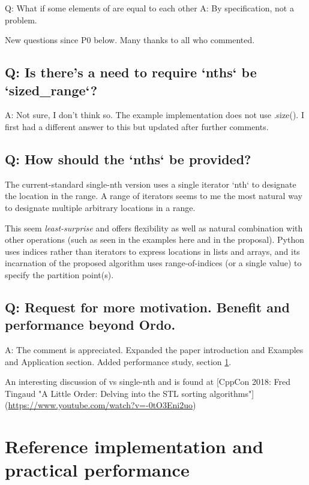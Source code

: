 Q: What if some elements of  are equal to each other A: By specification, not a problem.

New questions since P0 below. Many thanks to all who commented.

\subsection{Q: Is there's a need to require `nths` be `sized_range`?}

A: Not sure, I don't think so. The example implementation does not use .size(). I first had a different answer to this but updated after further comments.


\subsection{Q: How should the `nths` be provided?}

The current-standard single-nth version uses a single iterator `nth` to designate the location in the range. A range of iterators seems to me the most natural way to designate multiple arbitrary locations in a range.

This seem \emph{least-surprise} and offers flexibility as well as natural combination with other operations (such as seen in the examples here and in the proposal). Python uses indices rather than iterators to express locations in lists and arrays, and its incarnation of the proposed algorithm uses range-of-indices (or a single value) to specify the partition point(s)\cite{NpPart}.

\subsection{Q: Request for more motivation. Benefit and performance beyond Ordo.}

A: The comment is appreciated. Expanded the paper introduction and Examples and Application section. Added performance study, section \ref{perfstudy}.

An interesting discussion of  vs single-nth  and  is found at [CppCon 2018: Fred Tingaud "A Little Order: Delving into the STL sorting algorithms"](\url{https://www.youtube.com/watch?v=-0tO3Eni2uo})

\newpage
\section{Reference implementation and practical performance}
\label{perfstudy}


